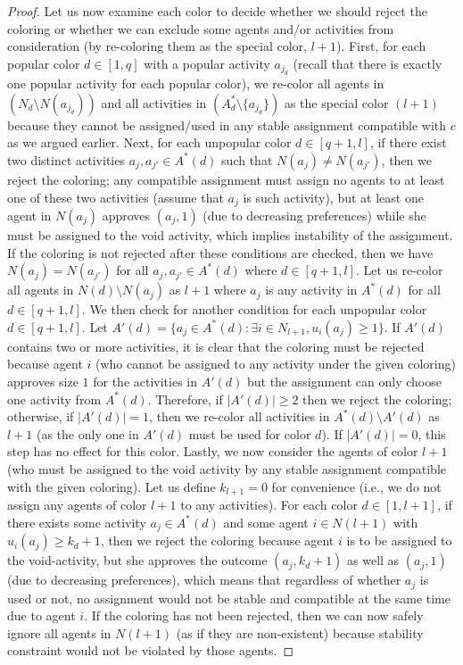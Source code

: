 \begin{proof}
Let us now examine each color to decide whether we should reject the coloring or whether we can exclude some agents and/or activities from consideration (by re-coloring them as the special color, $l+1$).
First, for each popular color $d\in [1, q]$ with a popular activity $a_{j_d}$ (recall that there is exactly one popular activity for each popular color), we re-color all agents in $(N_d \setminus N(a_{j_d}))$ and all activities in $(A^*_d \setminus \{a_{j_d}\})$ as the special color $(l+1)$ because they cannot be assigned/used in any stable assignment compatible with $c$ as we argued earlier. 
Next, for each unpopular color $d\in [q+1, l]$, if there exist two distinct activities $a_j, a_{j'} \in A^*(d)$ such that $N(a_j) \neq N(a_{j'})$, then we reject the coloring; any compatible assignment must assign no agents to at least one of these two activities (assume that $a_j$ is such activity), but at least one agent in $N(a_j)$ approves $(a_j, 1)$ (due to decreasing preferences) while she must be assigned to the void activity, which implies instability of the assignment. If the coloring is not rejected after these conditions are checked, then we have $N(a_j) = N(a_{j'})$ for all $a_j, a_{j'}\in A^*(d)$ where $d\in [q+1, l]$. Let us re-color all agents in $N(d) \setminus N(a_j)$ as $l+1$ where $a_j$ is any activity in $A^*(d)$ for all $d\in [q+1, l]$.
We then check for another condition for each unpopular color $d\in [q+1,l]$. Let $A'(d) = \{a_j \in A^*(d) : \exists i \in N_{l+1}, u_i(a_j) \geq 1\}$. If $A'(d)$ contains two or more activities, it is clear that the coloring must be rejected because agent $i$ (who cannot be assigned to any activity under the given coloring) approves size $1$ for the activities in $A'(d)$ but the assignment can only choose one activity from $A^*(d)$. Therefore, if $|A'(d)| \geq 2$ then we reject the coloring; otherwise, if $|A'(d)| = 1$, then we re-color all activities in $A^*(d) \setminus A'(d)$ as $l+1$ (as the only one in $A'(d)$ must be used for color $d$). If $|A'(d)| = 0$, this step has no effect for this color. 
Lastly, we now consider the agents of color $l+1$ (who must be assigned to the void activity by any stable assignment compatible with the given coloring).
Let us define $k_{l+1} = 0$ for convenience (i.e., we do not assign any agents of color $l+1$ to any activities).
For each color $d \in [1, l+1]$, if there exists some activity $a_j\in A^*(d)$ and some agent $i\in N(l+1)$ with $u_i(a_j) \geq k_{d} + 1$, then we reject the coloring because agent $i$ is to be assigned to the void-activity, but she approves the outcome $(a_j, k_d+1)$ as well as $(a_j, 1)$ (due to decreasing preferences), which means that regardless of whether $a_j$ is used or not, no assignment would not be stable and compatible at the same time due to agent $i$. 
If the coloring has not been rejected, then we can now safely ignore all agents in $N(l+1)$ (as if they are non-existent) because stability constraint would not be violated by those agents. 


\end{proof}
